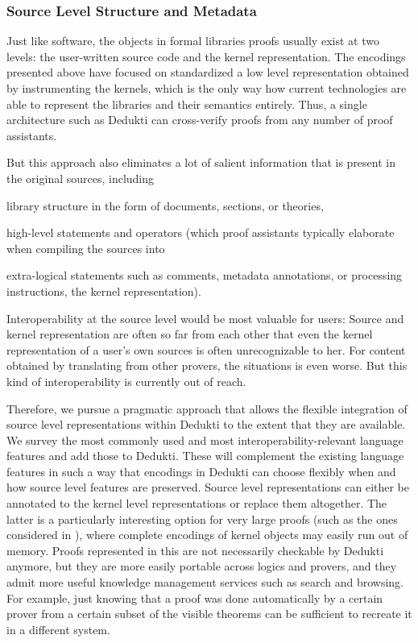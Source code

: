 \subsubsection{Source Level Structure and Metadata}

Just like software, the objects in formal libraries proofs usually exist at two levels: the user-written source code and the kernel representation.
The encodings presented above have focused on standardized a low level representation obtained by instrumenting the kernels, which is the only way how current technologies are able to represent the libraries and their semantics entirely.
Thus, a single architecture such as Dedukti can cross-verify proofs from any number of proof assistants.

But this approach also eliminates a lot of salient information that is present in the original sources, including
\begin{compactitem}
 \item library structure in the form of documents, sections, or theories,
 \item high-level statements and operators (which proof assistants typically elaborate when compiling the sources into  \item extra-logical statements such as comments, metadata annotations, or processing instructions,
the kernel representation).
\end{compactitem}

Interoperability at the source level would be most valuable for users:
Source and kernel representation are often so far from each other that even the kernel representation of a user's own sources is often unrecognizable to her.
For content obtained by translating from other provers, the situations is even worse.
But this kind of interoperability is currently out of reach.

Therefore, we pursue a pragmatic approach that allows the flexible integration of source level representations within Dedukti to the extent that they are available.
We survey the most commonly used and most interoperability-relevant language features and add those to Dedukti.
These will complement the existing language features in such a way that encodings in Dedukti can choose flexibly when and how source level features are preserved.
Source level representations can either be annotated to the kernel level representations or replace them altogether.
The latter is a particularly interesting option for very large proofs (such as the ones considered in ), where complete encodings of kernel objects may easily run out of memory.
Proofs represented in this are not necessarily checkable by Dedukti anymore, but they are more easily portable across logics and provers, and they admit more useful knowledge management services such as search and browsing.
For example, just knowing that a proof was done automatically by a certain prover from a certain subset of the visible theorems can be sufficient to recreate it in a different system.

